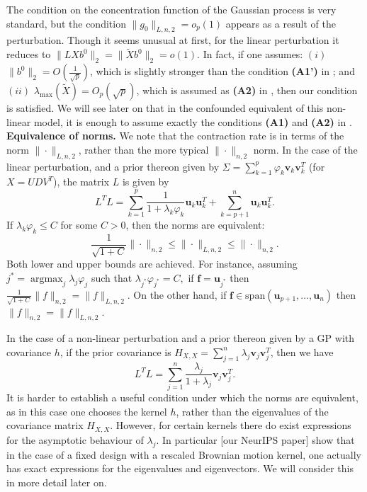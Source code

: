 \documentclass[11pt]{article}
\newcommand{\subparspace}{\vspace{3mm} \\}
\newcommand{\subparspacenonewline}{\vspace{3mm}}
\numberwithin{equation}{section}
\begin{document}
 The condition on the concentration function of the Gaussian process is very standard, but the condition $\| g_0\|_{L, n, 2} = o_p(1)$ appears as a result of the perturbation. Though it seems unusual at first, for the linear perturbation it reduces to $\|L X b^0\|_2 = \|\tilde{X} b^0\|_2 = o(1).$ In fact, if one assumes: $(i)$ $\|b^0\|_2 = O\left(\frac{1}{\sqrt{p}} \right)$, which is slightly stronger than the condition {\bf (A1')} in \cite{CBM2020}; and $(ii)$ $\lambda_{\max}(\tilde{X}) = O_p(\sqrt{p})$, which is assumed as {\bf (A2)} in \cite{CBM2020}, then our condition is satisfied. We will see later on that in  the confounded equivalent of this non-linear model, it is enough to assume exactly the conditions {\bf (A1)} and {\bf (A2)} in \cite{CBM2020}.
\subparspace
{\bf Equivalence of norms.} We note that the contraction rate is in terms of the norm $\|\cdot\|_{L, n, 2}$, rather than the more typical $\|\cdot\|_{n, 2}$ norm. In the case of the linear perturbation, and a prior thereon given by $\Sigma = \sum_{k = 1}^p \varphi_k \mathbf{v}_k \mathbf{v}_k^T$ (for $X = UDV^T$), the matrix $L$ is given by 
$$
L^TL = \sum_{k=1}^p\frac{1}{1+\lambda_k \varphi_k}\mathbf{u}_k \mathbf{u}_k^T + \sum_{k = p+1}^n \mathbf{u}_k \mathbf{u}_k^T.$$ If $\lambda_k \varphi_k \leq C$
for some $C > 0$, then the norms are equivalent:
$$
\frac{1}{\sqrt{1+C}} \|\cdot\|_{n ,2} \leq  \|\cdot\|_{L, n ,2} \leq \|\cdot\|_{n , 2}.
$$ 
Both lower and upper bounds are achieved. For instance, assuming $j^* = \operatorname{argmax}_j \lambda_j \varphi_j$ such that $\lambda_{j^*}\varphi_{j^*} = C,$ if $\mathbf{f} = \mathbf{u}_{j^*}$ then $\frac{1}{\sqrt{1+C}}\|f\|_{n, 2} = \|f\|_{L, n, 2}$. On the other hand, if $\mathbf{f} \in \textrm{span}(\mathbf{u}_{p+1}, \dots, \mathbf{u}_{n})$ then $\|f\|_{n, 2} = \|f\|_{L, n, 2}$.

 In the case of a non-linear perturbation and a prior thereon given by a GP with covariance $h$, if the prior covariance is $H_{X, X} = \sum_{j = 1}^n \lambda_j \mathbf{v}_j \mathbf{v}_j^T$, then we have 
 $$
 L^T L = \sum_{j = 1}^n \frac{\lambda_j}{1+\lambda_j} \mathbf{v}_j \mathbf{v}_j^T.
 $$ 
It is harder to establish a useful condition under which the norms are equivalent, as in this case one chooses the kernel $h$, rather than the eigenvalues of the covariance matrix $H_{X, X}$. However, for certain kernels there do exist expressions for the asymptotic behaviour of $\lambda_j$. In particular [our NeurIPS paper] show that in the case of a fixed design with a rescaled Brownian motion kernel, one actually has exact expressions for the eigenvalues and eigenvectors. We will consider this in more detail later on.
\end{document}
